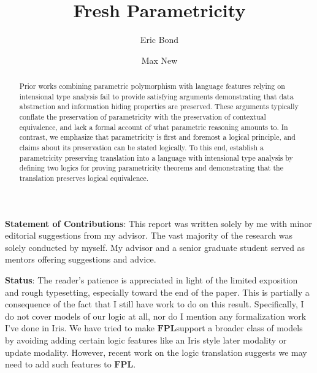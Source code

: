 \documentclass[acmsmall]{acmart}
\newcommand{\fpl}{$\mathbf{FPL}$}
\begin{document}
\textbf{Statement of Contributions}:
This report was written solely by me with minor editorial suggestions from my advisor.
The vast majority of the research was solely conducted by myself. My advisor and a senior graduate student served as mentors offering suggestions and advice.

\textbf{Status}:
The reader’s patience is appreciated in light of the limited exposition and rough typesetting, especially toward the end of the paper. This is partially a consequence of the fact that I still have work to do on this result. Specifically, I do not cover models of our logic at all, nor do I mention any formalization work I've done in Iris. We have tried to make \fpl\;support a broader class of models by avoiding adding certain logic features like an Iris style later modality or update modality. However, recent work on the logic translation suggests we may need to add such features to \fpl.
\clearpage

\title{Fresh Parametricity}


\author{Eric Bond}

\author{Max New}



\begin{abstract}
Prior works combining parametric polymorphism with language features relying on intensional type analysis fail to provide satisfying arguments demonstrating that data abstraction and information hiding properties are preserved. These arguments typically conflate the preservation of parametricity with the preservation of contextual equivalence, and lack a formal account of what parametric reasoning amounts to. In contrast, we emphasize that parametricity is first and foremost a logical principle, and claims about its preservation can be stated logically. To this end, establish a parametricity preserving translation into a language with intensional type analysis by defining two logics for proving parametricity theorems and demonstrating that the translation preserves logical equivalence. 
\end{abstract}
\end{document}
